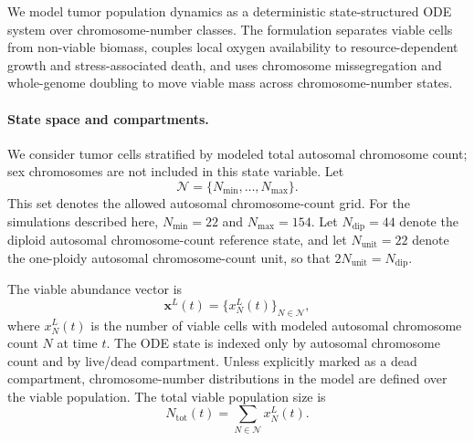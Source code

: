 \documentclass[11pt]{article}
\begin{document}
We model tumor population dynamics as a deterministic state-structured ODE system over chromosome-number classes. The formulation separates viable cells from non-viable biomass, couples local oxygen availability to resource-dependent growth and stress-associated death, and uses chromosome missegregation and whole-genome doubling to move viable mass across chromosome-number states.

\paragraph{State space and compartments.}

We consider tumor cells stratified by modeled total autosomal chromosome count; sex chromosomes are not included in this state variable. Let
\begin{equation}
\mathcal{N}=\{N_{\min},\dots,N_{\max}\}.
\label{eq:appendix_state_grid}
\end{equation}
This set denotes the allowed autosomal chromosome-count grid. For the simulations described here, $N_{\min}=22$ and $N_{\max}=154$. Let $N_{\mathrm{dip}}=44$ denote the diploid autosomal chromosome-count reference state, and let $N_{\mathrm{unit}}=22$ denote the one-ploidy autosomal chromosome-count unit, so that $2N_{\mathrm{unit}}=N_{\mathrm{dip}}$.

The viable abundance vector is
\begin{equation}
\mathbf{x}^L(t)=\{x_N^L(t)\}_{N\in\mathcal N},
\label{eq:appendix_viable_vector}
\end{equation}
where $x_N^L(t)$ is the number of viable cells with modeled autosomal chromosome count $N$ at time $t$. The ODE state is indexed only by autosomal chromosome count and by live/dead compartment. Unless explicitly marked as a dead compartment, chromosome-number distributions in the model are defined over the viable population. The total viable population size is
\begin{equation}
N_{\mathrm{tot}}(t)=\sum_{N\in\mathcal N}x_N^L(t).
\label{eq:appendix_total_viable_population}
\end{equation}
\end{document}
